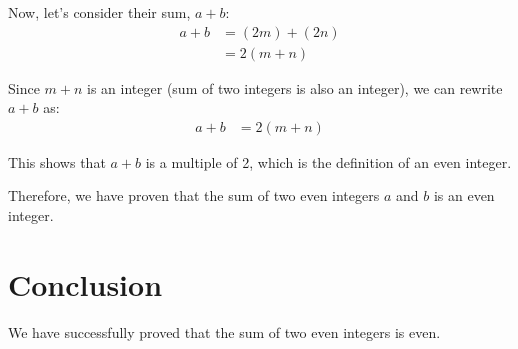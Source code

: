 \documentclass{article}
\begin{document}
Now, let's consider their sum, $a + b$:
\begin{align*}
a + b &= (2m) + (2n) \\
&= 2(m + n)
\end{align*}

Since $m + n$ is an integer (sum of two integers is also an integer), we can rewrite $a + b$ as:
\begin{align*}
a + b &= 2(m + n)
\end{align*}

This shows that $a + b$ is a multiple of 2, which is the definition of an even integer.

Therefore, we have proven that the sum of two even integers $a$ and $b$ is an even integer.

\section{Conclusion}
We have successfully proved that the sum of two even integers is even.
\end{document}
